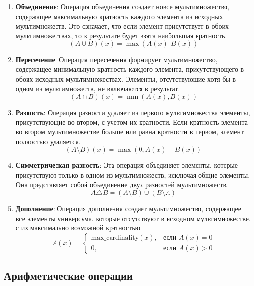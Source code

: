 \documentclass[12pt,a4paper]{article}
\begin{document}
\begin{enumerate}
    \item \textbf{Объединение}: Операция объединения создает новое мультимножество, содержащее максимальную кратность каждого элемента из исходных мультимножеств. Это означает, что если элемент присутствует в обоих мультимножествах, то в результате будет взята наибольшая кратность.
    $$(A \cup B)(x) = \max(A(x), B(x))$$
    
    \item \textbf{Пересечение}: Операция пересечения формирует мультимножество, содержащее минимальную кратность каждого элемента, присутствующего в обоих исходных мультимножествах. Элементы, отсутствующие хотя бы в одном из мультимножеств, не включаются в результат.
    $$(A \cap B)(x) = \min(A(x), B(x))$$
    
    \item \textbf{Разность}: Операция разности удаляет из первого мультимножества элементы, присутствующие во втором, с учетом их кратности. Если кратность элемента во втором мультимножестве больше или равна кратности в первом, элемент полностью удаляется.
    $$(A \setminus B)(x) = \max(0, A(x) - B(x))$$
    
    \item \textbf{Симметрическая разность}: Эта операция объединяет элементы, которые присутствуют только в одном из мультимножеств, исключая общие элементы. Она представляет собой объединение двух разностей мультимножеств.
    $$A \triangle B = (A \setminus B) \cup (B \setminus A)$$
    
    \item \textbf{Дополнение}: Операция дополнения создает мультимножество, содержащее все элементы универсума, которые отсутствуют в исходном мультимножестве, с их максимально возможной кратностью.
    $$\overline{A}(x) = \begin{cases} 
        \text{max\_cardinality}(x), & \text{если } A(x) = 0 \\
        0, & \text{если } A(x) > 0
    \end{cases}$$
\end{enumerate}

\subsection{Арифметические операции}
\end{document}
